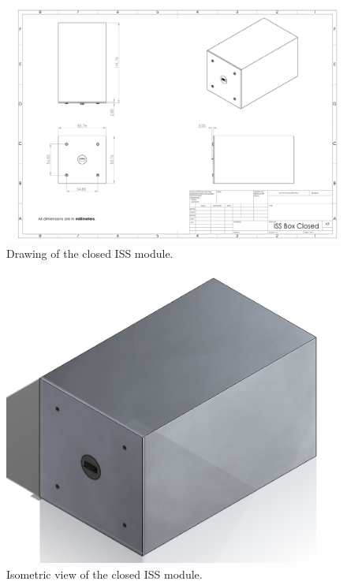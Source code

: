 \begin{centering}
  \begin{figure}[H]
    \includegraphics[width=\textwidth]{Figures/iss-closed.pdf}
    \caption{Drawing of the closed ISS module.}
    \label{fig:iss-closed-drawing}
  \end{figure}
  \begin{figure}[H]
    \includegraphics[width=\textwidth]{Figures/iss-closed.png}
    \caption{Isometric view of the closed ISS module.}
    \label{fig:iss-closed-image}
  \end{figure}
  \begin{figure}[H]

\end{figure}
\end{centering}

